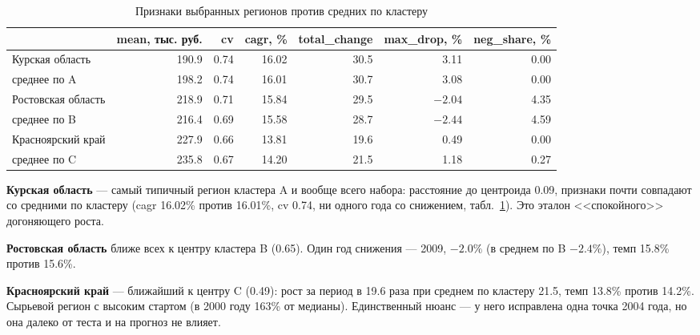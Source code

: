 \documentclass[12pt,a4paper]{report}
\begin{document}
\begin{table}[H]
\centering
\caption{Признаки выбранных регионов против средних по кластеру}
\label{tab:rep_vs_cluster}
\small
\begin{tabular}{lrrrrrr}
\toprule
 & mean, тыс. руб. & cv & cagr, \% & total\_change & max\_drop, \% & neg\_share, \% \\
\midrule
Курская область & 190.9 & 0.74 & 16.02 & 30.5 & 3.11 & 0.00 \\
среднее по A & 198.2 & 0.74 & 16.01 & 30.7 & 3.08 & 0.00 \\
\midrule
Ростовская область & 218.9 & 0.71 & 15.84 & 29.5 & $-2.04$ & 4.35 \\
среднее по B & 216.4 & 0.69 & 15.58 & 28.7 & $-2.44$ & 4.59 \\
\midrule
Красноярский край & 227.9 & 0.66 & 13.81 & 19.6 & 0.49 & 0.00 \\
среднее по C & 235.8 & 0.67 & 14.20 & 21.5 & 1.18 & 0.27 \\
\bottomrule
\end{tabular}
\end{table}

\textbf{Курская область} --- самый типичный регион кластера A и вообще всего набора: расстояние до центроида 0.09, признаки почти совпадают со средними по кластеру (cagr 16.02\% против 16.01\%, cv 0.74, ни одного года со снижением, табл.~\ref{tab:rep_vs_cluster}). Это эталон <<спокойного>> догоняющего роста.

\textbf{Ростовская область} ближе всех к центру кластера B (0.65). Один год снижения --- 2009, $-2.0\%$ (в среднем по B $-2.4\%$), темп 15.8\% против 15.6\%.

\textbf{Красноярский край} --- ближайший к центру C (0.49): рост за период в 19.6 раза при среднем по кластеру 21.5, темп 13.8\% против 14.2\%. Сырьевой регион с высоким стартом (в 2000 году 163\% от медианы). Единственный нюанс --- у него исправлена одна точка 2004 года, но она далеко от теста и на прогноз не влияет.

\begin{table}[H]
\centering
\caption{Базовая статистика выбранных регионов, 2000--2023}
\label{tab:base_stats}
\small
{}
\end{table}
\end{document}
